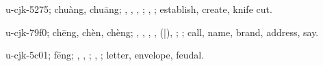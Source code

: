 \begin{multicols}{2}
{\cjkgGlue{}u-cjk-5275; chuàng, chuāng; \cjkgGlue{}\cjkgGlue{}\cjkgGlue{}, \cjkgGlue{}\cjkgGlue{}\cjkgGlue{}, \cjkgGlue{}, \cjkgGlue{}\cjkgGlue{}\cjkgGlue{}; \cjkgGlue{}, \cjkgGlue{}; establish, create, knife cut.

\cjkgGlue{}u-cjk-79f0; chēng, chèn, chèng; \cjkgGlue{}\cjkgGlue{}\cjkgGlue{}, \cjkgGlue{}\cjkgGlue{}\cjkgGlue{}, \cjkgGlue{}\cjkgGlue{}\cjkgGlue{}, \cjkgGlue{}\cjkgGlue{}\cjkgGlue{}, \cjkgGlue{}\cjkgGlue{}(\cjkgGlue{}|\cjkgGlue{}), \cjkgGlue{}\cjkgGlue{}\cjkgGlue{}; \cjkgGlue{}; call, name, brand, address, say.

\cjkgGlue{}u-cjk-5c01; fēng; \cjkgGlue{}, \cjkgGlue{}, \cjkgGlue{}; \cjkgGlue{}, \cjkgGlue{}; letter, envelope, feudal.

}
\end{multicols}

